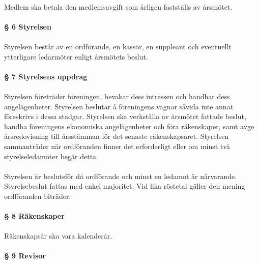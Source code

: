 \documentclass[12pt, a4paper]{article}
\begin{document}
\paragraph{}
Medlem ska betala den medlemsavgift som årligen fastställs av årsmötet.

\pagebreak


\paragraph{§ 6 Styrelsen}
\paragraph{}
Styrelsen består av en ordförande, en kassör, en suppleant och eventuellt ytterligare ledarmöter enligt årsmötets beslut.

\paragraph{§ 7 Styrelsens uppdrag}
\paragraph{}
Styrelsen företräder föreningen, bevakar dess intressen och handhar dess angelägenheter. Styrelsen beslutar å föreningens vägnar såvida inte annat
föreskrivs i dessa stadgar. Styrelsen ska verkställa av årsmötet fattade beslut, handha föreningens ekonomiska angelägenheter och föra räkenskaper,
samt avge årsredovisning till årsstämman för det senaste räkenskapsåret. Styrelsen sammanträder när ordföranden finner det erforderligt eller om
minst två styrelseledamöter begär detta.

\paragraph{}
Styrelsen är beslutsför då ordförande och minst en ledamot är närvarande. Styrelsebeslut fattas med enkel majoritet. Vid lika röstetal gäller den mening
ordföranden biträder.

\paragraph{§ 8 Räkenskaper}
\paragraph{}
Räkenskapsår ska vara kalenderår.

\paragraph{§ 9 Revisor}
\end{document}
